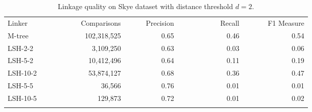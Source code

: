 \documentclass{llncs}
\begin{document}
\begin{table}[t]
\caption{Linkage quality on Skye dataset with distance threshold
$d= 2$.}
\label{comparison-of-results-demography-skye}
\centering
\begin{footnotesize}
\begin{tabular}{lrrrr} \hline\noalign{\smallskip}
  Linker~~~~~~~~~~ & ~~~Comparisons & ~~~~~Precision & 
  ~~~~~~~~~~~Recall & ~~~~~~F1 Measure \\
\noalign{\smallskip} \hline \noalign{\smallskip}
M-tree    & 102,318,525                 & 0.65      & 0.46   & 0.54      \\
\noalign{\smallskip} \hline \noalign{\smallskip}
LSH-2-2  & 3,109,250                   & 0.63      & 0.03   & 0.06       \\

LSH-5-2  & 10,412,496                  & 0.64      & 0.11   & 0.19       \\

LSH-10-2 & 53,874,127                  & 0.68      & 0.36   & 0.47       \\

LSH-5-5  & 36,566                     & 0.76      & 0.01   & 0.01       \\

LSH-10-5 & 129,873                    & 0.72      & 0.01   & 0.02       \\
\noalign{\smallskip} \hline
\end{tabular}
\end{footnotesize}
\end{table}

\end{document}

